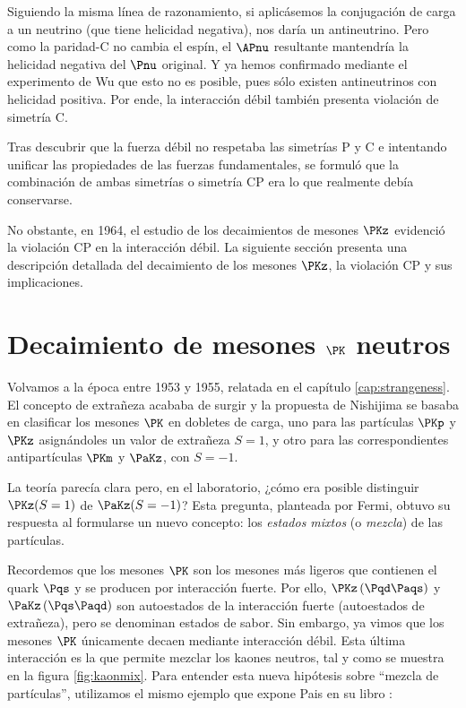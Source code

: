 Siguiendo la misma línea de razonamiento, si aplicásemos la conjugación de carga a un neutrino (que tiene helicidad negativa), nos daría un antineutrino. Pero como la paridad-C no cambia el espín, el $\APnu$ resultante mantendría la helicidad negativa del $\Pnu$ original. Y ya hemos confirmado mediante el experimento de Wu que esto no es posible, pues sólo existen antineutrinos con helicidad positiva. Por ende, la interacción débil también presenta violación de simetría C.

Tras descubrir que la fuerza débil no respetaba las simetrías P y C e intentando unificar las propiedades de las fuerzas fundamentales, se formuló que la combinación de ambas simetrías o simetría CP era lo que realmente debía conservarse.

No obstante, en 1964, el estudio de los decaimientos de mesones $\PKz$ evidenció la violación CP en la interacción débil. La siguiente sección presenta una descripción detallada del decaimiento de los mesones $\PKz$, la violación CP y sus implicaciones.
\vspace{5mm}

\section{Decaimiento de mesones $\PK$ neutros}
\label{sec:neutral_kaon_decay}
Volvamos a la época entre 1953 y 1955, relatada en el capítulo \ref{cap:strangeness}. El concepto de extrañeza acababa de surgir y la propuesta de Nishijima se basaba en clasificar los mesones $\PK$ en dobletes de carga, uno para las partículas $\PKp$ y $\PKz$ asignándoles un valor de extrañeza $S=1$, y otro para las correspondientes antipartículas $\PKm$ y $\PaKz$, con $S=-1$.

La teoría parecía clara pero, en el laboratorio, ¿cómo era posible distinguir $\PKz(S=1)$ de $\PaKz(S=-1)$? Esta pregunta, planteada por Fermi, obtuvo su respuesta al formularse un nuevo concepto: los \textit{estados mixtos} (o \textit{mezcla}) de las partículas.

Recordemos que los mesones $\PK$ son los mesones más ligeros que contienen el quark $\Pqs$ y se producen por interacción fuerte. Por ello, $\PKz\left(\Pqd\Paqs\right) $ y $\PaKz\left(\Pqs\Paqd\right)$ son autoestados de la interacción fuerte (autoestados de extrañeza), pero se denominan estados de sabor. Sin embargo, ya vimos que los mesones $\PK$ únicamente decaen mediante interacción débil. Esta última interacción es la que permite mezclar los kaones neutros, tal y como se muestra en la figura \ref{fig:kaonmix}. Para entender esta nueva hipótesis sobre ``mezcla de partículas'', utilizamos el mismo ejemplo que expone Pais en su libro \cite{Pais}:

